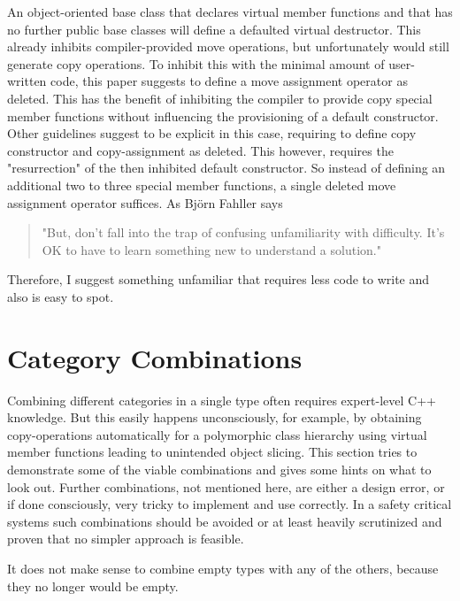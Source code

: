 \documentclass[ebook,11pt,article]{memoir}
\begin{document}
An object-oriented base class that declares virtual member functions and that has no further public base classes will define a defaulted virtual destructor. This already inhibits compiler-provided move operations, but unfortunately would still generate copy operations. To inhibit this with the minimal amount of user-written code, this paper suggests to define a move assignment operator as deleted. This has the benefit of inhibiting the compiler to provide copy special member functions without influencing the provisioning of a default constructor. Other guidelines suggest to be explicit in this case, requiring to define copy constructor and copy-assignment as deleted. This however, requires the "resurrection" of the then inhibited default constructor. So instead of defining an additional two to three special member functions, a single deleted move assignment operator suffices. As Björn Fahller says 

\begin{quote}
{"But, don't fall into the trap of confusing unfamiliarity with difficulty. It's OK to have to learn something new to understand a solution."} 
\end{quote}

Therefore, I suggest something unfamiliar that requires less code to write and also is easy to spot.
 
\section{Category Combinations}
Combining different categories in a single type often requires expert-level C++ knowledge. 
But this easily happens unconsciously, for example, by obtaining copy-operations automatically for a polymorphic class hierarchy using virtual member functions leading to unintended object slicing. 
This section tries to demonstrate some of the viable combinations and gives some hints on what to look out.
Further combinations, not mentioned here, are either a design error, or if done consciously, very tricky to implement and use correctly. In a safety critical systems such combinations should be avoided or at least heavily scrutinized and proven that no simpler approach is feasible.

It does not make sense to combine empty types with any of the others, because they no longer would be empty.
\end{document}
